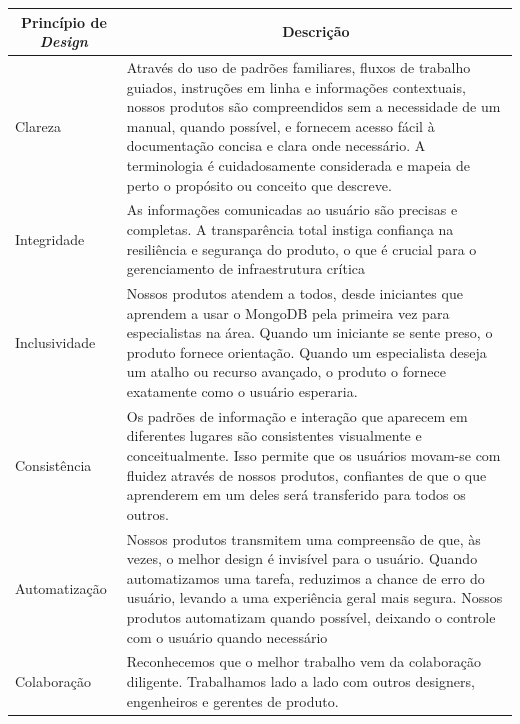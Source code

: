 \begin{quadro}[!htb]
	\centering
	\begin{tabular}{|m{2cm}|m{12cm}|} \hline
		
		\multicolumn{1}{|c|}{\bfseries Princípio de \textit{Design}} & \multicolumn{1}{c|}{\bfseries Descrição} \\\hline
		
		 Clareza & Através do uso de padrões familiares, fluxos de trabalho guiados, instruções em linha e informações contextuais, nossos produtos são compreendidos sem a necessidade de um manual, quando possível, e fornecem acesso fácil à documentação concisa e clara onde necessário. A terminologia é cuidadosamente considerada e mapeia de perto o propósito ou conceito que descreve. \\\hline
		 
		 Integridade & As informações comunicadas ao usuário são precisas e completas. A transparência total instiga confiança na resiliência e segurança do produto, o que é crucial para o gerenciamento de infraestrutura crítica \\\hline
		 
		 Inclusividade & Nossos produtos atendem a todos, desde iniciantes que aprendem a usar o MongoDB pela primeira vez para especialistas na área. Quando um iniciante se sente preso, o produto fornece orientação. Quando um especialista deseja um atalho ou recurso avançado, o produto o fornece exatamente como o usuário esperaria. \\\hline
		 
		 Consistência & Os padrões de informação e interação que aparecem em diferentes lugares são consistentes visualmente e conceitualmente. Isso permite que os usuários movam-se com fluidez através de nossos produtos, confiantes de que o que aprenderem em um deles será transferido para todos os outros. \\\hline
		 
		 Automatização & Nossos produtos transmitem uma compreensão de que, às vezes, o melhor design é invisível para o usuário. Quando automatizamos uma tarefa, reduzimos a chance de erro do usuário, levando a uma experiência geral mais segura. Nossos produtos automatizam quando possível, deixando o controle com o usuário quando necessário \\\hline
		 
		 Colaboração & Reconhecemos que o melhor trabalho vem da colaboração diligente. Trabalhamos lado a lado com outros designers, engenheiros e gerentes de produto. \\\hline
		 

\end{tabular}
\end{quadro}
